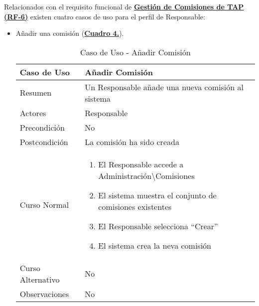 \pagebreak
Relacionados con el requisito funcional de \textbf{\hyperref[tab:rfGestComTAP]{Gestión de Comisiones de TAP (RF-6)}} existen cuatro casos de uso para el perfil de Responsable:
\begin{itemize}
	\item \addtocounter{tabla}{1} Añadir una comisión (\textbf{\hyperref[tab:curCrearComision]{Cuadro 4.}}).
		\begin{table}[!htbp]
		  \centering  \addtocounter{casouso}{1}
		  \begin{tabular}{|l | p{100mm}|}
		    \textbf{Caso de Uso}  & \textbf{Añadir Comisión} \\ \hline
		    Resumen 		 & Un Responsable añade una nueva comisión al sistema \\ \hline
		    Actores  		 & Responsable \\ \hline
		    Precondición  	 & No \\ \hline
		    Postcondición  	 & La comisión ha sido creada \\ \hline
		    Curso Normal   	 & \begin{enumerate}
			  \item El Responsable accede a Administración\textbackslash Comisiones
			  \item El sistema muestra el conjunto de comisiones existentes
			  \item El Responsable selecciona ``Crear''
			  \item El sistema crea la neva comisión
		    \end{enumerate}  \\ \hline
		    Curso Alternativo  & No  \\ \hline
		    Observaciones 	 & No  \\ \hline
		  \end{tabular}
		  \caption{Caso de Uso  - Añadir Comisión}
		  \label{tab:curCrearComision}
		\end{table}
		\FloatBarrier
	

\end{itemize}
